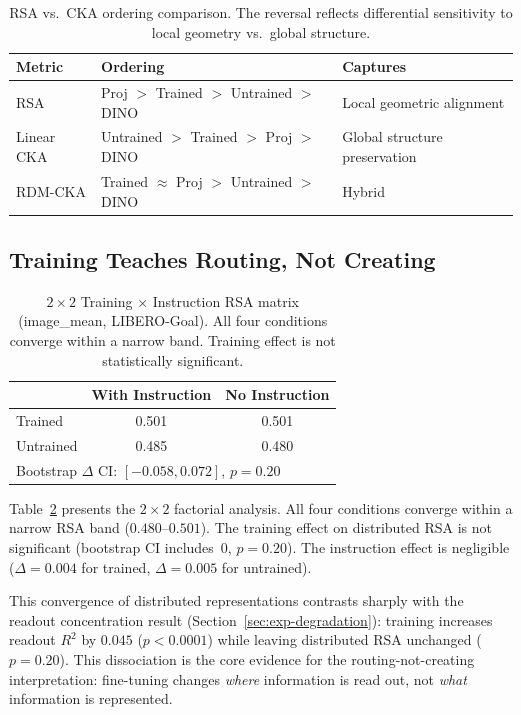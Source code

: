 \documentclass[letterpaper]{article}
\begin{document}
\begin{table}[t]
\centering
\caption{RSA vs.\ CKA ordering comparison. The reversal reflects differential sensitivity to local geometry vs.\ global structure.}
\label{tab:cka}
\begin{tabular}{lll}
\toprule
\textbf{Metric} & \textbf{Ordering} & \textbf{Captures} \\
\midrule
RSA        & Proj $>$ Trained $>$ Untrained $>$ DINO & Local geometric alignment \\
Linear CKA & Untrained $>$ Trained $>$ Proj $>$ DINO & Global structure preservation \\
RDM-CKA    & Trained $\approx$ Proj $>$ Untrained $>$ DINO & Hybrid \\
\bottomrule
\end{tabular}
\end{table}

\subsection{Training Teaches Routing, Not Creating}
\label{sec:exp-routing}

\begin{table}[t]
\centering
\caption{$2\times2$ Training $\times$ Instruction RSA matrix (image\_mean, LIBERO-Goal). All four conditions converge within a narrow band. Training effect is not statistically significant.}
\label{tab:2x2}
\begin{tabular}{lcc}
\toprule
 & \textbf{With Instruction} & \textbf{No Instruction} \\
\midrule
Trained   & 0.501 & 0.501 \\
Untrained & 0.485 & 0.480 \\
\midrule
\multicolumn{3}{l}{Bootstrap $\Delta$ CI: $[-0.058, 0.072]$, $p = 0.20$} \\
\bottomrule
\end{tabular}
\end{table}

Table~\ref{tab:2x2} presents the $2{\times}2$ factorial analysis.
All four conditions converge within a narrow RSA band ($0.480$--$0.501$).
The training effect on distributed RSA is not significant (bootstrap CI includes~0, $p{=}0.20$).
The instruction effect is negligible ($\Delta{=}0.004$ for trained, $\Delta{=}0.005$ for untrained).

This convergence of distributed representations contrasts sharply with the readout concentration result (Section~\ref{sec:exp-degradation}): training increases readout $R^2$ by $0.045$ ($p{<}0.0001$) while leaving distributed RSA unchanged ($p{=}0.20$).
This dissociation is the core evidence for the routing-not-creating interpretation: fine-tuning changes \emph{where} information is read out, not \emph{what} information is represented.
\end{document}
